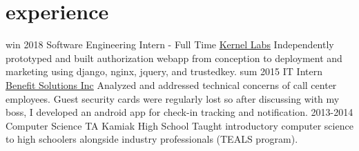 \documentclass[]{friggeri-cv}
\begin{document}
\section{experience}

\begin{entrylist}
  \entry
    {win 2018}
    {Software Engineering Intern - Full Time}
    {\href{http://www.kernellabs.io/}{Kernel Labs}}
    {Independently prototyped and built authorization webapp from conception to deployment and marketing using django, nginx, jquery, and trustedkey.}
  \entry
    {sum 2015}
    {IT Intern}
    {\href{http://www.bsitpa.com/}{Benefit Solutions Inc}}
    {Analyzed and addressed technical concerns of call center employees. Guest security cards were regularly lost so after discussing with my boss, I developed an android app for check-in tracking and notification.}
  \entry
    {2013-2014}
    {Computer Science TA}
    {Kamiak High School}
    {Taught introductory computer science to high schoolers alongside industry professionals (TEALS program).}
\end{entrylist}






%
\end{document}
